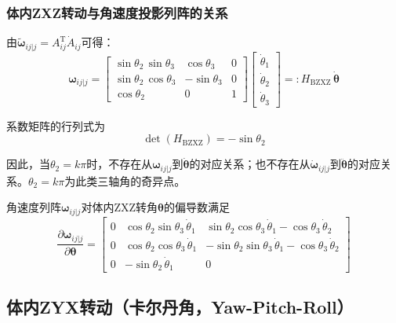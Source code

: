 \subsubsection*{体内ZXZ转动与角速度投影列阵的关系}

由$\tilde{\boldsymbol{\omega}}_{ij|j} = A_{ij}^{\mathrm{T}}\dot{A}_{ij}$可得：
\begin{equation}
\boldsymbol{\omega}_{ij|j} =
\begin{bmatrix}
\sin\theta_2\,\sin\theta_3 & \cos\theta_3  & 0 \\[3pt]
\sin\theta_2\,\cos\theta_3 & -\sin\theta_3 & 0 \\[3pt]
\cos\theta_2               & 0            & 1
\end{bmatrix}
\begin{bmatrix}
\dot{\theta}_1 \\ \dot{\theta}_2 \\ \dot{\theta}_3
\end{bmatrix}
=: H_{\mathrm{BZXZ}}\,\dot{\boldsymbol{\theta}}
\label{eq:7.13}
\end{equation}

系数矩阵的行列式为
\begin{equation}
\det(H_{\mathrm{BZXZ}}) = -\sin\theta_2
\end{equation}

因此，当$\theta_2 = k\pi$时，不存在从$\boldsymbol{\omega}_{ij|j}$到$\dot{\boldsymbol{\theta}}$的对应关系；也不存在从$\dot{\boldsymbol{\omega}}_{ij|j}$到$\ddot{\boldsymbol{\theta}}$的对应关系。$\theta_2 = k\pi$为此类三轴角的奇异点。

角速度列阵$\boldsymbol{\omega}_{ij|j}$对体内ZXZ转角$\boldsymbol{\theta}$的偏导数满足
\begin{equation}
\frac{\partial\boldsymbol{\omega}_{ij|j}}{\partial\boldsymbol{\theta}}
=
\begin{bmatrix}
0 & \cos\theta_2\sin\theta_3\,\dot{\theta}_1 & \sin\theta_2\cos\theta_3\,\dot{\theta}_1 - \cos\theta_3\,\dot{\theta}_2 \\[3pt]
0 & \cos\theta_2\cos\theta_3\,\dot{\theta}_1 & -\sin\theta_2\sin\theta_3\,\dot{\theta}_1 - \cos\theta_3\,\dot{\theta}_2 \\[3pt]
0 & -\sin\theta_2\,\dot{\theta}_1           & 0
\end{bmatrix}
\label{eq:7.14}
\end{equation}

\subsection{体内ZYX转动（卡尔丹角，Yaw-Pitch-Roll）}

